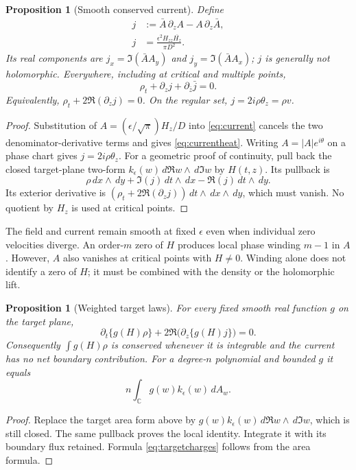 \documentclass[11pt]{article}
\newcommand{\C}{\mathbb C}
\newcommand{\dd}{\,d}
\newcommand{\eps}{\epsilon}
\newtheorem{proposition}[theorem]{Proposition}
\theoremstyle{definition}
\theoremstyle{remark}
\begin{document}
\begin{proposition}[Smooth conserved current]
Define
\begin{align}
 j&:=\bar A\,\partial_zA-A\,\partial_z\bar A,
 \label{eq:current}\\
 j&=\frac{\eps^2H_{zz}\overline{H_z}}{\pi D^2}.
 \label{eq:currentheat}
\end{align}
Its real components are
$j_x=\Im(\bar A A_y)$ and $j_y=\Im(\bar A A_x)$;
$j$ is generally not holomorphic.
Everywhere, including at critical and multiple points,
\begin{equation}
 \rho_t+\partial_zj+\partial_{\bar z}\bar j=0.
 \label{eq:continuity}
\end{equation}
Equivalently, $\rho_t+2\Re(\partial_zj)=0$.
On the regular set, $j=2i\rho\theta_z=\rho v$.
\end{proposition}
\begin{proof}
Substitution of $A=(\eps/\sqrt\pi)H_z/D$ into
\eqref{eq:current} cancels the two denominator-derivative terms and
gives \eqref{eq:currentheat}. Writing $A=|A|e^{i\theta}$ on a
phase chart gives $j=2i\rho\theta_z$. For a geometric proof of
continuity, pull back the closed target-plane two-form
$k_\eps(w)\dd\Re w\wedge\dd\Im w$ by $H(t,z)$. Its pullback is
\[
 \rho\dd x\wedge\dd y+\Im(j)\dd t\wedge\dd x
 -\Re(j)\dd t\wedge\dd y.
\]
Its exterior derivative is
$(\rho_t+2\Re(\partial_z j))\dd t\wedge\dd x\wedge\dd y$,
which must vanish. No quotient by $H_z$ is used at critical points.
\end{proof}

The field and current remain smooth at fixed $\eps$ even when
individual zero velocities diverge. An order-$m$ zero of $H$ produces
local phase winding $m-1$ in $A$. However, $A$ also vanishes at critical
points with $H\ne0$. Winding alone does not identify a zero of $H$;
it must be combined with the density or the holomorphic lift.

\begin{proposition}[Weighted target laws]
For every fixed smooth real function $g$ on the target plane,
\begin{equation}
 \partial_t\{g(H)\rho\}
 +2\Re\bigl(\partial_z\{g(H)j\}\bigr)=0.
 \label{eq:targetlaws}
\end{equation}
Consequently $\int g(H)\rho$ is conserved whenever it is integrable
and the current has no net boundary contribution. For a degree-$n$
polynomial and bounded $g$ it equals
\begin{equation}
 n\int_\C g(w)k_\eps(w)\dd A_w. \label{eq:targetcharges}
\end{equation}
\end{proposition}
\begin{proof}
Replace the target area form above by
$g(w)k_\eps(w)\dd\Re w\wedge\dd\Im w$, which is still closed.
The same pullback proves the local identity. Integrate it with its
boundary flux retained. Formula \eqref{eq:targetcharges} follows from
the area formula.
\end{proof}
\end{document}
